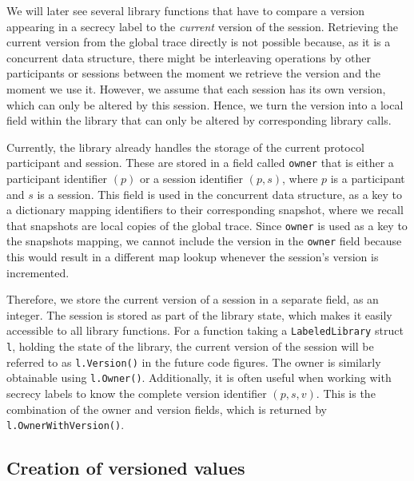 We will later see several library functions that have to compare a version appearing in a secrecy label to the \emph{current} version of the session.
Retrieving the current version from the global trace directly is not possible because, as it is a concurrent data structure, there might be interleaving operations by other participants or sessions between the moment we retrieve the version and the moment we use it.
However, we assume that each session has its own version, which can only be altered by this session.
Hence, we turn the version into a local field within the library that can only be altered by corresponding library calls.

Currently, the library already handles the storage of the current protocol participant and session.
These are stored in a field called \texttt{owner} that is either a participant identifier $(p)$ or a session identifier $(p,s)$, where $p$ is a participant and $s$ is a session.
This field is used in the concurrent data structure, as a key to a dictionary mapping identifiers to their corresponding snapshot, where we recall that snapshots are local copies of the global trace.
Since \texttt{owner} is used as a key to the snapshots mapping, we cannot include the version in the \texttt{owner} field because this would result in a different map lookup whenever the session's version is incremented.

Therefore, we store the current version of a session in a separate field, as an integer.
The session is stored as part of the library state, which makes it easily accessible to all library functions.
For a function taking a \texttt{LabeledLibrary} struct \texttt{l}, holding the state of the library, the current version of the session will be referred to as \texttt{l.Version()} in the future code figures.
The owner is similarly obtainable using \texttt{l.Owner()}.
Additionally, it is often useful when working with secrecy labels to know the complete version identifier $(p,s,v)$. This is the combination of the owner and version fields, which is returned by \texttt{l.OwnerWithVersion()}.

\subsection{Creation of versioned values}
\label{sec:creation-of-versioned-values}

